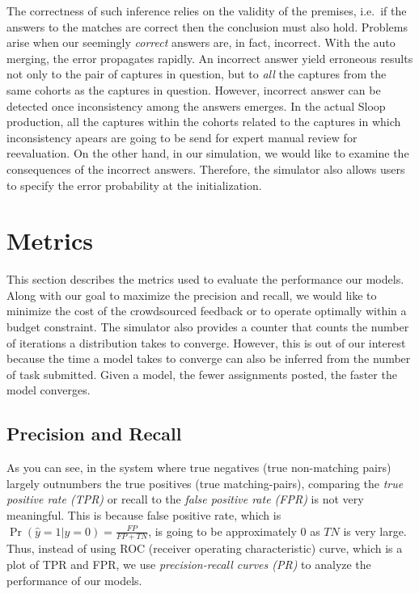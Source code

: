 The correctness of such inference relies on the validity of the premises, i.e.\
if the answers to the matches are correct then the conclusion must also hold.
Problems arise when our seemingly \emph{correct} answers are, in fact,
incorrect. With the auto merging, the error propagates rapidly. An incorrect
answer yield erroneous results not only to the pair of captures in question,
but to \emph{all} the captures from the same cohorts as the captures in
question. However, incorrect answer can be  detected once inconsistency among
the answers emerges. In the actual Sloop production, all the captures within
the cohorts related to the captures in which inconsistency apears are going to
be send for expert manual review for reevaluation. On the other hand, in our
simulation, we would like to examine the consequences of the incorrect answers.
Therefore, the simulator also allows users to specify the error probability at
the initialization.

\section{Metrics} %
\label{sec:metrices}

This section describes the metrics used to evaluate the performance our
models. Along with our goal to maximize the precision and recall, we would like
to minimize the cost of the crowdsourced feedback or to operate optimally within a
budget constraint. The simulator also provides a counter that counts the number
of iterations a distribution takes to converge. However, this is out of our
interest because the time a model takes to converge can also be inferred from
the number of task submitted. Given a model, the fewer assignments posted, the
faster the model converges. 

\subsection{Precision and Recall} %
\label{sub:precision_and_recall}

As you can see, in the system where true negatives (true non-matching pairs)
largely outnumbers the true positives (true matching-pairs), comparing the
\emph{true positive rate (TPR)} or recall to the \emph{false positive rate
(FPR)} is not very meaningful. This is because false positive rate, which is
$\Pr{(\hat{y}=1|y=0)} = \frac{FP}{FP+TN}$, is going to be approximately 0 as
$TN$ is very large. Thus, instead of using ROC (receiver operating
characteristic) curve, which is a plot of TPR and FPR, we use
\emph{precision-recall curves (PR)} to analyze the performance of our models.

